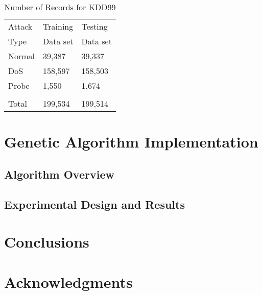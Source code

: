 \documentclass{sig-alternate}
\begin{document}
\begin{table}
\caption{Number of Records for KDD99}
\begin{tabular}{|lll|} \hline
Attack & Training & Testing\\
Type   & Data set & Data set\\ \hline
Normal & 39,387 & 39,337\\
DoS & 158,597 & 158,503\\
Probe & 1,550 & 1,674\\
 & &\\
 Total & 199,534 & 199,514\\

\hline\end{tabular}
\label{tab:RecordsForKDD99}
\end{table}



\section{Genetic Algorithm Implementation}

\subsection{Algorithm Overview}

\subsection{Experimental Design and Results}





\section{Conclusions}





\section{Acknowledgments}





  
\end{document}
